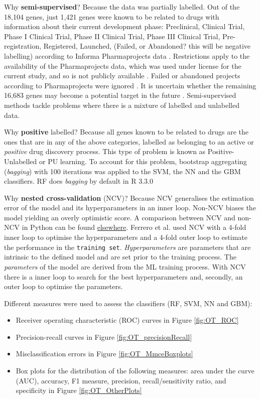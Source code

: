 Why \textbf{semi-supervised}? Because the data was partially labelled. Out of the 18,104 genes, just 1,421 genes were known to be related to drugs with information about their current development phase: Preclinical, Clinical Trial, Phase I Clinical Trial, Phase II Clinical Trial, Phase III Clinical Trial, Pre-registration, Registered, Launched, (Failed, or Abandoned? this will be negative labelling) according to Informa Pharmaprojects data \cite{pharmaProjects}. Restrictions apply to the availability of the Pharmaprojects data, which was used under license for the current study, and so is not publicly available \cite{ferrero2017}. Failed or abandoned projects according to Pharmaprojects were ignored \cite{ferrero2017}. It is uncertain whether the remaining 16,683 genes may become a potential target in the future \cite{ferrero2017}. Semi-supervised methods tackle problems where there is a mixture of labelled and unlabelled data.
    
Why \textbf{positive} labelled? Because all genes known to be related to drugs are the ones that are in any of the above categories, labelled as belonging to an active or \emph{positive} drug discovery process. This type of problem is known as Positive-Unlabelled or PU learning. To account for this problem, bootstrap aggregating (\emph{bagging}) with 100 iterations was applied to the SVM, the NN and the GBM classifiers. RF does \emph{bagging} by default in R 3.3.0
    
Why \textbf{nested cross-validation} (NCV)? Because NCV generalises the estimation error of the model and its hyperparameters in an inner loop. Non-NCV biases the model yielding an overly optimistic score. A comparison between NCV and non-NCV in Python can be found \href{https://goo.gl/soHYT7}{elsewhere}. Ferrero et al. used NCV with a 4-fold inner loop to optimise the hyperparameters and a 4-fold outer loop to estimate the performance in the \texttt{training set}. \emph{Hyperparameters} are parameters that are intrinsic to the defined model and are set prior to the training process. The \emph{parameters} of the model are derived from the ML training process. With NCV there is a inner loop to search for the best hyperparameters and, secondly, an outer loop to optimise the parameters.


Different measures were used to assess the classifiers (RF, SVM, NN and GBM):
\begin{itemize}
    \item Receiver operating characteristic (ROC) curves in Figure \ref{fig:OT_ROC}
    \item Precision-recall curves in Figure \ref{fig:OT_precisionRecall}
    \item Misclassification errors in Figure \ref{fig:OT_MmceBoxplots}
    \item Box plots for the distribution of the following measures: area under the curve (AUC), accuracy, F1 measure, precision, recall/sensitivity ratio, and specificity in Figure \ref{fig:OT_OtherPlots}
\end{itemize}

